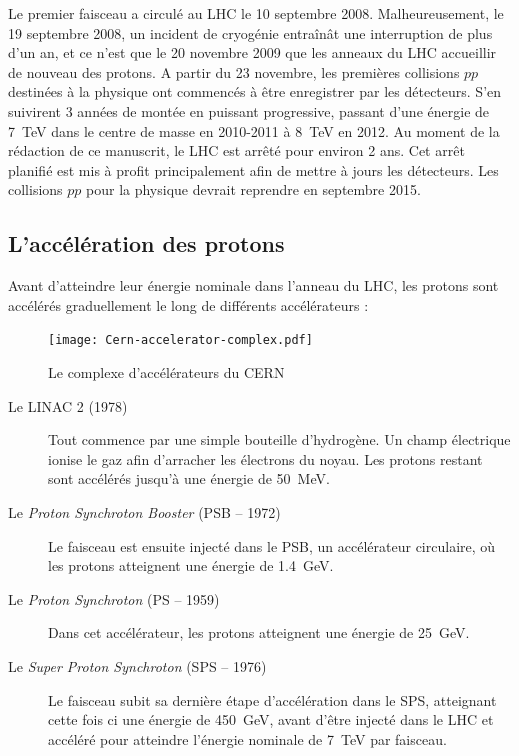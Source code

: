 Le premier faisceau a circulé au LHC le 10 septembre 2008. Malheureusement, le 19 septembre 2008, un incident de cryogénie entraînât une interruption de plus d'un an, et ce n'est que le 20 novembre 2009 que les anneaux du LHC accueillir de nouveau des protons. A partir du 23 novembre, les premières collisions $pp$ destinées à la physique ont commencés à être enregistrer par les détecteurs. S'en suivirent 3 années de montée en puissant progressive, passant d'une énergie de \SI{7}{\TeV} dans le centre de masse en 2010-2011 à \SI{8}{\TeV} en 2012. Au moment de la rédaction de ce manuscrit, le LHC est arrêté pour environ 2 ans. Cet arrêt planifié est mis à profit principalement afin de mettre à jours les détecteurs. Les collisions $pp$ pour la physique devrait reprendre en septembre 2015.

\subsection{L'accélération des protons}
Avant d'atteindre leur énergie nominale dans l'anneau du LHC, les protons sont accélérés graduellement le long de différents accélérateurs :

\begin{figure} \centering
  \texttt{[image: Cern-accelerator-complex.pdf]}
  \caption{Le complexe d'accélérateurs du CERN}
  \label{fig:lhc_complex}
\end{figure}

\begin{description}
  \item[Le LINAC 2 (1978)] Tout commence par une simple bouteille d'hydrogène. Un champ électrique ionise le gaz afin d'arracher les électrons du noyau. Les protons restant sont accélérés jusqu'à une énergie de \SI{50}{\MeV}.
  \item[Le \emph{Proton Synchroton Booster} (PSB -- 1972)] Le faisceau est ensuite injecté dans le PSB, un accélérateur circulaire, où les protons atteignent une énergie de \SI{1.4}{\GeV}.
  \item[Le \emph{Proton Synchroton} (PS -- 1959)] Dans cet accélérateur, les protons atteignent une énergie de \SI{25}{GeV}.
  \item[Le \emph{Super Proton Synchroton} (SPS -- 1976)] Le faisceau subit sa dernière étape d'accélération dans le SPS, atteignant cette fois ci une énergie de \SI{450}{\GeV}, avant d'être injecté dans le LHC et accéléré pour atteindre l'énergie nominale de \SI{7}{\TeV} par faisceau.
\end{description}

